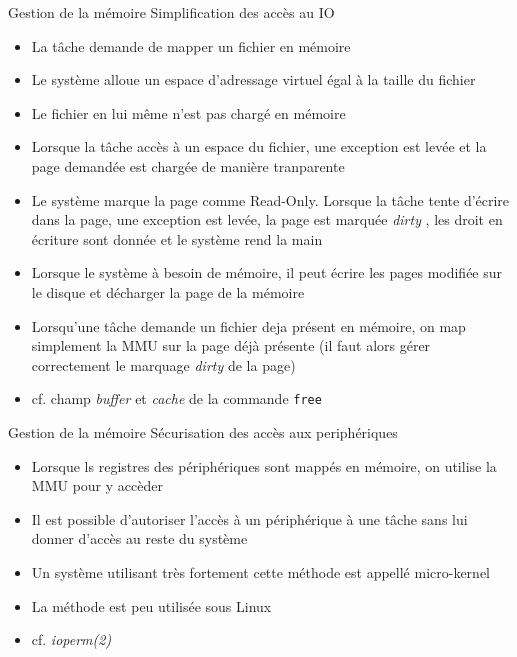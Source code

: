 \begin{frame}{Gestion de la mémoire}
  Simplification des accès au IO
  \begin{itemize} 
  \item La tâche demande de mapper un fichier en mémoire
  \item  Le système  alloue un  espace d'adressage  virtuel égal  à la
    taille du fichier
  \item Le fichier en lui même n'est pas chargé en mémoire
  \item Lorsque la  tâche accès à un espace  du fichier, une exception
    est levée et la page demandée est chargée de manière tranparente
  \item Le  système marque la  page comme Read-Only. Lorsque  la tâche
    tente d'écrire dans la page,  une exception est levée, la page est
    marquée \emph{dirty}  , les  droit en écriture  sont donnée  et le
    système rend la main
  \item Lorsque  le système  à besoin de  mémoire, il peut  écrire les
    pages modifiée sur le disque et décharger la page de la mémoire
  \item Lorsqu'une  tâche demande un fichier deja  présent en mémoire,
    on map simplement la MMU sur  la page déjà présente (il faut alors
    gérer correctement le marquage \emph{dirty} de la page)
  \item  cf.   champ  \emph{buffer}  et \emph{cache}  de  la  commande
    \texttt{free}
  \end{itemize}
\end{frame}

\begin{frame}{Gestion de la mémoire}
  Sécurisation des accès aux periphériques
  \begin{itemize}
  \item Lorsque  ls registres des périphériques sont  mappés en mémoire,
    on utilise la MMU pour y accèder
  \item Il  est possible d'autoriser  l'accès à un périphérique  à une
    tâche sans lui donner d'accès au reste du système
  \item Un système utilisant  très fortement cette méthode est appellé
    micro-kernel
  \item La méthode est peu utilisée sous Linux
  \item cf. \emph{ioperm(2)}
  \end{itemize}
\end{frame}

